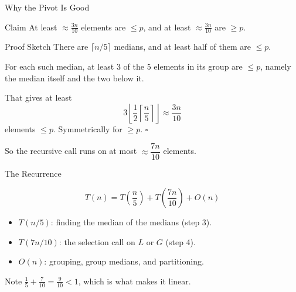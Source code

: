 \documentclass[10pt,aspectratio=169]{beamer}
\begin{document}
\begin{frame}{Why the Pivot Is Good}
  \begin{center}
  \end{center}

  \begin{block}{Claim}
    At least $\approx \frac{3n}{10}$ elements are $\le p$, and at least $\approx \frac{3n}{10}$ are $\ge p$.
  \end{block}
\end{frame}

\begin{frame}{Proof Sketch}
  There are $\lceil n/5 \rceil$ medians, and at least \alert{half} of them are $\le p$.

  \bigskip
  For each such median, at least \alert{3 of the 5} elements in its group are $\le p$,
  namely the median itself and the two below it.

  \bigskip
  That gives at least
  \[
    3 \left\lfloor \frac{1}{2}\left\lceil \frac{n}{5} \right\rceil \right\rfloor
    \approx \frac{3n}{10}
  \]
  elements $\le p$. Symmetrically for $\ge p$. $\square$

  \bigskip
  \begin{center}
    So the recursive call runs on at most $\approx \dfrac{7n}{10}$ elements.
  \end{center}
\end{frame}

\begin{frame}{The Recurrence}
  \begin{alertblock}{}
    \[
      T(n) = T\!\left(\frac{n}{5}\right) + T\!\left(\frac{7n}{10}\right) + O(n)
    \]
  \end{alertblock}

  \bigskip
  \begin{itemize}
    \item $T(n/5)$: finding the median of the medians (step 3).
    \item $T(7n/10)$: the selection call on $L$ or $G$ (step 4).
    \item $O(n)$: grouping, group medians, and partitioning.
  \end{itemize}

  \bigskip
  \begin{center}
    \small Note $\frac{1}{5} + \frac{7}{10} = \frac{9}{10} < 1$, which is what makes it linear.
  \end{center}
\end{frame}
\end{document}
